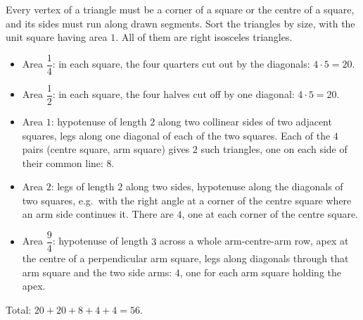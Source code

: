Every vertex of a triangle must be a corner of a square or the centre of a square, and its sides must run along drawn segments. Sort the triangles by size, with the unit square having area $1$. All of them are right isosceles triangles.
\begin{itemize}
\item Area $\dfrac{1}{4}$: in each square, the four quarters cut out by the diagonals: $4\cdot5=20$.
\item Area $\dfrac{1}{2}$: in each square, the four halves cut off by one diagonal: $4\cdot5=20$.
\item Area $1$: hypotenuse of length $2$ along two collinear sides of two adjacent squares, legs along one diagonal of each of the two squares. Each of the $4$ pairs (centre square, arm square) gives $2$ such triangles, one on each side of their common line: $8$.
\item Area $2$: legs of length $2$ along two sides, hypotenuse along the diagonals of two squares, e.g.\ with the right angle at a corner of the centre square where an arm side continues it. There are $4$, one at each corner of the centre square.
\item Area $\dfrac{9}{4}$: hypotenuse of length $3$ across a whole arm-centre-arm row, apex at the centre of a perpendicular arm square, legs along diagonals through that arm square and the two side arms: $4$, one for each arm square holding the apex.
\end{itemize}
Total: $20+20+8+4+4=\boxed{56}$.
